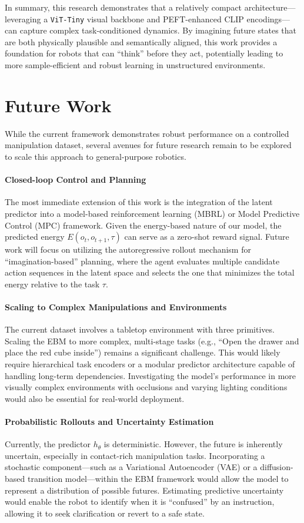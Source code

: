 In summary, this research demonstrates that a relatively compact architecture—leveraging a \texttt{ViT-Tiny} visual backbone and PEFT-enhanced CLIP encodings—can capture complex task-conditioned dynamics. By imagining future states that are both physically plausible and semantically aligned, this work provides a foundation for robots that can ``think'' before they act, potentially leading to more sample-efficient and robust learning in unstructured environments.

\section{Future Work}

While the current framework demonstrates robust performance on a controlled manipulation dataset, several avenues for future research remain to be explored to scale this approach to general-purpose robotics.

\paragraph{Closed-loop Control and Planning}
The most immediate extension of this work is the integration of the latent predictor into a model-based reinforcement learning (MBRL) or Model Predictive Control (MPC) framework. Given the energy-based nature of our model, the predicted energy $E(o_t, o_{t+1}, \tau)$ can serve as a zero-shot reward signal. Future work will focus on utilizing the autoregressive rollout mechanism for ``imagination-based'' planning, where the agent evaluates multiple candidate action sequences in the latent space and selects the one that minimizes the total energy relative to the task $\tau$.

\paragraph{Scaling to Complex Manipulations and Environments}
The current dataset involves a tabletop environment with three primitives. Scaling the EBM to more complex, multi-stage tasks (e.g., ``Open the drawer and place the red cube inside'') remains a significant challenge. This would likely require hierarchical task encoders or a modular predictor architecture capable of handling long-term dependencies. Investigating the model's performance in more visually complex environments with occlusions and varying lighting conditions would also be essential for real-world deployment.

\paragraph{Probabilistic Rollouts and Uncertainty Estimation}
Currently, the predictor $h_\theta$ is deterministic. However, the future is inherently uncertain, especially in contact-rich manipulation tasks. Incorporating a stochastic component—such as a Variational Autoencoder (VAE) or a diffusion-based transition model—within the EBM framework would allow the model to represent a distribution of possible futures. Estimating predictive uncertainty would enable the robot to identify when it is ``confused'' by an instruction, allowing it to seek clarification or revert to a safe state.

